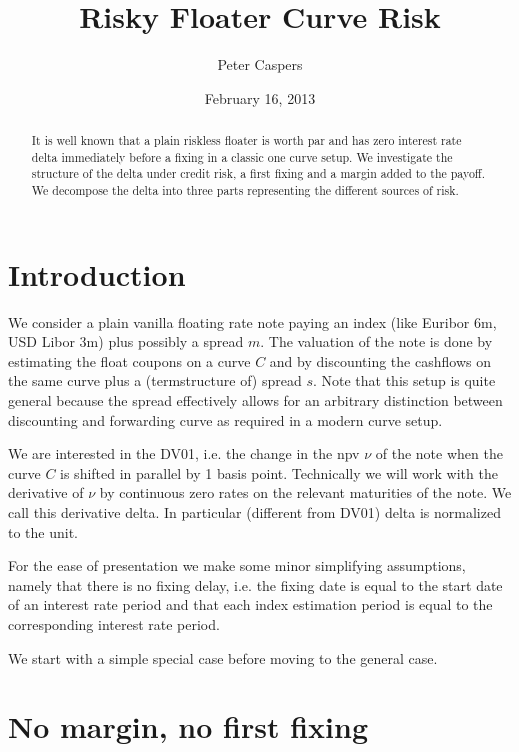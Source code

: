 \documentclass{amsart}
\theoremstyle{plain}
\numberwithin{equation}{section}
\begin{document}
\title[Risky Floater Curve Risk]{Risky Floater Curve Risk}
\author{Peter Caspers}
\date{February 16, 2013}
\begin{abstract}
It is well known that a plain riskless floater is worth par and has zero interest rate delta immediately before a fixing in a classic one curve setup. We investigate the structure of the delta under credit risk, a first fixing and a margin added to the payoff. We decompose the delta into three parts representing the different sources of risk.
\end{abstract}

\maketitle

\section{Introduction}

We consider a plain vanilla floating rate note paying an index (like Euribor 6m, USD Libor 3m) plus possibly a spread $m$. The valuation of the note
is done by estimating the float coupons on a curve $C$ and by discounting the cashflows on the same curve plus a (termstructure of) spread $s$. Note that this
setup is quite general because the spread effectively allows for an arbitrary distinction between discounting and forwarding curve as
required in a modern curve setup.

We are interested in the DV01, i.e. the change in the npv $\nu$ of the note when the curve $C$ is shifted in parallel by 1 basis point.
Technically we will work with the derivative of $\nu$ by continuous zero rates on the relevant maturities of the note. We call this derivative
delta. In particular (different from DV01) delta is normalized to the unit.

For the ease of presentation we make some minor simplifying assumptions, namely that there is no fixing delay, i.e. the fixing date is equal to the
start date of an interest rate period and that each index estimation period is equal to the corresponding interest rate period. 

We start with a simple special case before moving to the general case.

\section{No margin, no first fixing}
\end{document}
